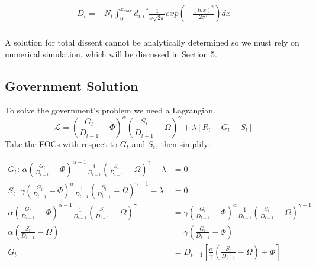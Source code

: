\documentclass[12pt]{article}
\begin{document}
\begin{spacing}{1.5}
\begin{equation}
	\begin{aligned}
D_t	=& N_t \int_{0}^{x_{max}} {{d}_{i,t}}^* \frac{1}{x \sqrt{2\pi}}exp  \left( -\frac{(lnx)^2}{2\sigma^2} \right)  dx \\	
	\end{aligned}
\end{equation}



A solution for total dissent cannot be analytically determined so we must rely on numerical simulation, which will be discussed in Section 5. 

\subsection{Government Solution}

To solve the government's problem we need a Lagrangian.
\begin{equation}
\mathcal{L} = \left(\frac{G_t}{ D_{t-1}}-\Phi\right)^\alpha \left(\frac{S_t}{ D_{t-1}}-\Omega\right)^\gamma  +\lambda[R_t-G_t-S_t] 
\end{equation}
Take the FOCs with respect to $G_t$ and $S_t$, then simplify:

\begin{equation}
    \begin{aligned}
        G_t\text{: } \alpha \left(\frac{G_t}{ D_{t-1}}-\Phi\right)^{\alpha-1} \frac{1}{ D_{t-1}} \left(\frac{S_t}{D_{t-1}}-\Omega\right)^\gamma  -\lambda &=0  \\
S_t\text{: } \gamma  \left(\frac{G_t}{ D_{t-1}}-\Phi\right)^{\alpha} \frac{1}{D_{t-1}} \left(\frac{S_t}{D_{t-1}}-\Omega\right)^{\gamma -1} -\lambda &=0 \\
\alpha \left(\frac{G_t}{D_{t-1}}-\Phi\right)^{\alpha-1} \frac{1}{ D_{t-1}} \left(\frac{S_t}{D_{t-1}}-\Omega\right)^\gamma  &= \gamma  \left(\frac{G_t}{ D_{t-1}}-\Phi\right)^{\alpha} \frac{1}{ D_{t-1}} \left(\frac{S_t}{ D_{t-1}}-\Omega\right)^{\gamma -1} \\
\alpha \left(\frac{S_t}{ D_{t-1}}-\Omega \right) &= \gamma  \left( \frac{G_t}{ D_{t-1}}-\Phi \right) \\
G_t&= D_{t-1}\left[\frac{\alpha}{\gamma } \left(\frac{S_t}{ D_{t-1}} -\Omega \right)+\Phi \right]
    \end{aligned}
\end{equation}


\end{spacing}
\end{document}
